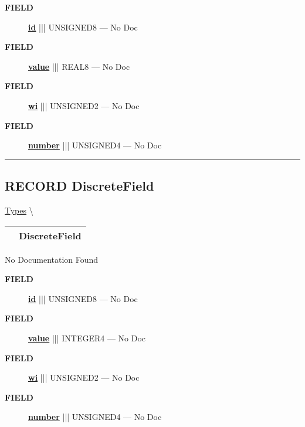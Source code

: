 \par
\begin{description}
\item [\colorbox{tagtype}{\color{white} \textbf{\textsf{FIELD}}}] \textbf{\underline{id}} ||| UNSIGNED8 --- No Doc
\item [\colorbox{tagtype}{\color{white} \textbf{\textsf{FIELD}}}] \textbf{\underline{value}} ||| REAL8 --- No Doc
\item [\colorbox{tagtype}{\color{white} \textbf{\textsf{FIELD}}}] \textbf{\underline{wi}} ||| UNSIGNED2 --- No Doc
\item [\colorbox{tagtype}{\color{white} \textbf{\textsf{FIELD}}}] \textbf{\underline{number}} ||| UNSIGNED4 --- No Doc
\end{description}





\rule{\linewidth}{0.5pt}
\subsection*{\textsf{\colorbox{headtoc}{\color{white} RECORD}
DiscreteField}}

\hypertarget{ecldoc:ml_core.types.discretefield}{}
\hspace{0pt} \hyperlink{ecldoc:ML_Core.Types}{Types} \textbackslash 

{\renewcommand{\arraystretch}{1.5}
\begin{tabularx}{\textwidth}{|>{\raggedright\arraybackslash}l|X|}
\hline
\hspace{0pt}\mytexttt{\color{red} } & \textbf{DiscreteField} \\
\hline
\end{tabularx}
}

\par





No Documentation Found







\par
\begin{description}
\item [\colorbox{tagtype}{\color{white} \textbf{\textsf{FIELD}}}] \textbf{\underline{id}} ||| UNSIGNED8 --- No Doc
\item [\colorbox{tagtype}{\color{white} \textbf{\textsf{FIELD}}}] \textbf{\underline{value}} ||| INTEGER4 --- No Doc
\item [\colorbox{tagtype}{\color{white} \textbf{\textsf{FIELD}}}] \textbf{\underline{wi}} ||| UNSIGNED2 --- No Doc
\item [\colorbox{tagtype}{\color{white} \textbf{\textsf{FIELD}}}] \textbf{\underline{number}} ||| UNSIGNED4 --- No Doc
\end{description}





